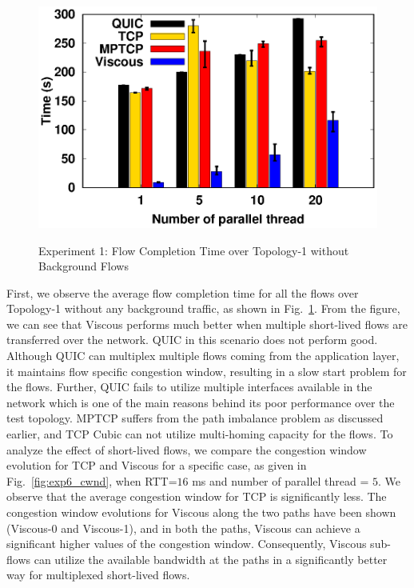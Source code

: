 \begin{figure}[!t]
\begin{center}
\begin{minipage}{0.45\linewidth}
        \end{minipage}
        \begin{minipage}{0.45\linewidth}
            \centering
            \includegraphics[width=0.24\linewidth]{img/exp6/time_elapsed_20}
            \label{fig:exp6_time_320}
        \end{minipage}
        \caption{\label{fig:exp6_time}Experiment 1: Flow Completion Time over Topology-1 without Background Flows}
    \end{center}
\end{figure}
First, we observe the average flow completion time for all the flows over Topology-1 without any background traffic, as shown in Fig.~\ref{fig:exp6_time}. From the figure, we can see that Viscous performs much better when multiple short-lived flows are transferred over the network. QUIC in this scenario does not perform good. Although QUIC can multiplex multiple flows coming from the application layer, it maintains flow specific congestion window, resulting in a slow start problem for the flows. Further, QUIC fails to utilize multiple interfaces available in the network which is one of the main reasons behind its poor performance over the test topology. MPTCP suffers from the path imbalance problem as discussed earlier, and TCP Cubic can not utilize multi-homing capacity for the flows. To analyze the effect of short-lived flows, we compare the congestion window evolution for TCP and Viscous for a specific case, as given in Fig.~\ref{fig:exp6_cwnd}, when RTT=$16$ ms and number of parallel thread = $5$. We observe that the average congestion window for TCP is significantly less. The congestion window evolutions for Viscous along the two paths have been shown (Viscous-0 and Viscous-1), and in both the paths, Viscous can achieve a significant higher values of the congestion window. Consequently, Viscous sub-flows can utilize the available bandwidth at the paths in a significantly better way for multiplexed short-lived flows. 

